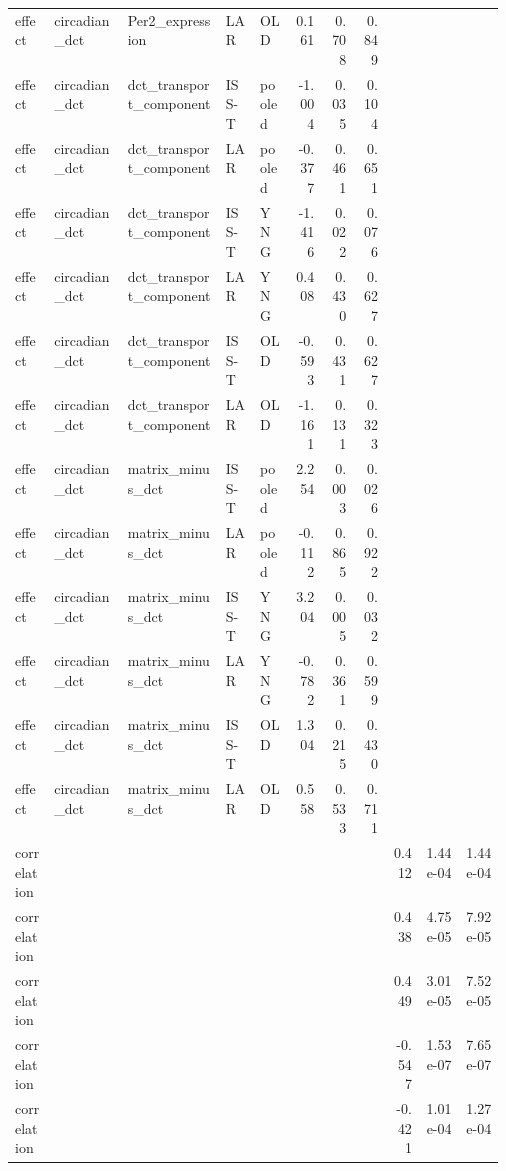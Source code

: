 \documentclass[11pt]{article}
\begin{document}
\begin{landscape}
\begin{longtable}{p{0.08\linewidth}p{0.15\linewidth}p{0.20\linewidth}p{0.07\linewidth}p{0.07\linewidth}rrrrrr}
effect & circadian\_dct & Per2\_expression & LAR & OLD & 0.161 & 0.708 & 0.849 &  &  &  \\
effect & circadian\_dct & dct\_transport\_component & ISS-T & pooled & -1.004 & 0.035 & 0.104 &  &  &  \\
effect & circadian\_dct & dct\_transport\_component & LAR & pooled & -0.377 & 0.461 & 0.651 &  &  &  \\
effect & circadian\_dct & dct\_transport\_component & ISS-T & YNG & -1.416 & 0.022 & 0.076 &  &  &  \\
effect & circadian\_dct & dct\_transport\_component & LAR & YNG & 0.408 & 0.430 & 0.627 &  &  &  \\
effect & circadian\_dct & dct\_transport\_component & ISS-T & OLD & -0.593 & 0.431 & 0.627 &  &  &  \\
effect & circadian\_dct & dct\_transport\_component & LAR & OLD & -1.161 & 0.131 & 0.323 &  &  &  \\
effect & circadian\_dct & matrix\_minus\_dct & ISS-T & pooled & 2.254 & 0.003 & 0.026 &  &  &  \\
effect & circadian\_dct & matrix\_minus\_dct & LAR & pooled & -0.112 & 0.865 & 0.922 &  &  &  \\
effect & circadian\_dct & matrix\_minus\_dct & ISS-T & YNG & 3.204 & 0.005 & 0.032 &  &  &  \\
effect & circadian\_dct & matrix\_minus\_dct & LAR & YNG & -0.782 & 0.361 & 0.599 &  &  &  \\
effect & circadian\_dct & matrix\_minus\_dct & ISS-T & OLD & 1.304 & 0.215 & 0.430 &  &  &  \\
effect & circadian\_dct & matrix\_minus\_dct & LAR & OLD & 0.558 & 0.533 & 0.711 &  &  &  \\
correlation &  &  &  &  &  &  &  & 0.412 & 1.44e-04 & 1.44e-04 \\
correlation &  &  &  &  &  &  &  & 0.438 & 4.75e-05 & 7.92e-05 \\
correlation &  &  &  &  &  &  &  & 0.449 & 3.01e-05 & 7.52e-05 \\
correlation &  &  &  &  &  &  &  & -0.547 & 1.53e-07 & 7.65e-07 \\
correlation &  &  &  &  &  &  &  & -0.421 & 1.01e-04 & 1.27e-04 \\
\bottomrule
\end{longtable}
\normalsize
\end{landscape}
\end{document}
